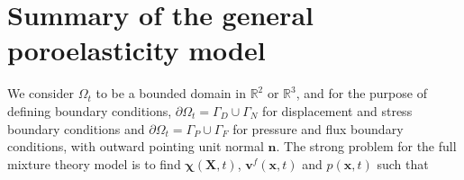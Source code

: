 \section{Summary of the general poroelasticity model}
We consider $\Omega_{t}$ to be a bounded domain in $\mathbb{R}^{2}$ or $\mathbb{R}^{3}$, and for the purpose of defining boundary conditions, $\partial\Omega_{t}=\Gamma_D \cup \Gamma_N$ for displacement and stress boundary conditions and $\partial\Omega_{t}=\Gamma_P \cup \Gamma_F$ for pressure and flux boundary conditions, with outward pointing unit normal $\mathbf{n}$. The strong problem for the full mixture theory model is to find $\boldsymbol{\chi}(\boldsymbol{X},t)$,  $\boldsymbol{v}^{f}(\boldsymbol{x},t)$ and $p(\boldsymbol{x},t)$ such that
\begin{comment}
\begin{subequations}
\begin{align}
\hat\rho^{s} \boldsymbol{a}^{s}+\hat \rho^{f} \boldsymbol{a}^{f} = \nabla \cdot( \boldsymbol{\sigma}_{e}+\boldsymbol{\sigma}_{vis}-p\boldsymbol{I}) + \rho\boldsymbol{f} \;\;\; \mbox{in} \; \Omega_{t},\\
\hat\rho^{f}\boldsymbol{a}^{f}+  \boldsymbol{v}^{f}\left(  \frac{d^{f}\hat{\rho}^{f}  }{dt}  + \hat{\rho}^{f}  \nabla \cdot \boldsymbol{v}^{f} \right)=\nabla \cdot( \boldsymbol{\sigma}_{vis}^{f}- \phi p \boldsymbol{I}) + p \nabla \phi - \phi \boldsymbol{k}^{-1}(\boldsymbol{v}^{f}-\boldsymbol{v}^{s}) + \hat\rho^{f}\boldsymbol{f}  \;\;\; \mbox{in} \; \Omega_{t}, \\
\nabla \cdot((1-\phi) \boldsymbol{v}^{s}) + \nabla \cdot (\phi \boldsymbol{v}^f)=g \;\;\;\;\;\mbox{in}\;\Omega_{t},
\\
\boldsymbol{\chi} =\boldsymbol{X}+\boldsymbol{u}_{D}   \;\;\; \mbox{on}\; \Gamma_{d},
\\
(\boldsymbol{\sigma}_{e}+\boldsymbol{\sigma}_{vis}-p\boldsymbol{I})\boldsymbol{n} = \boldsymbol{t}_{N}   \;\;\; \mbox{on}\; \Gamma_{t},
\\
\boldsymbol{v}^{f}   = \boldsymbol{v}^{f}_{D}  \;\;\; \mbox{on}\; \Gamma_{f},
\\
\mu_{f} \phi \frac{\partial \boldsymbol{v}^{f}}{\partial \boldsymbol{n}}- \phi p\boldsymbol{n}=\hat{\boldsymbol{s}}  \;\;\; \mbox{on}\; \Gamma_{p},
\\
\boldsymbol{\chi}(0) = \boldsymbol{X} + \boldsymbol{u}^{0},  \;\;\; \boldsymbol{v}^{s}(0) = {\boldsymbol{v}^{s0}},  \;\;\;\boldsymbol{v}^{f}(0) = {\boldsymbol{v}^{f0}} \;\;\;  \mbox{in}\;\Omega_{0}.
\end{align}
\label{eqn:full_mixture_model}
\end{subequations}
\end{comment}
